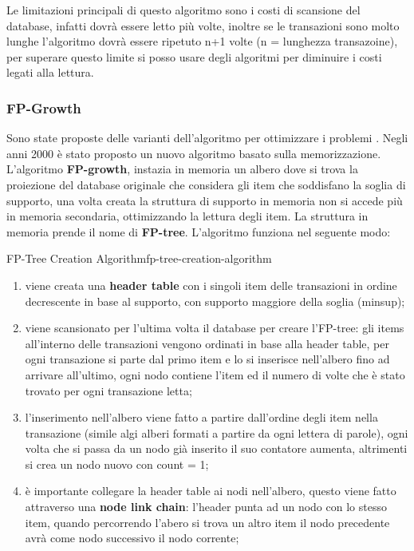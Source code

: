 \documentclass[12pt]{article}
\begin{document}
Le limitazioni principali di questo algoritmo sono i costi di scansione del database, infatti dovr\`a essere letto pi\`u volte, inoltre se le transazioni sono molto lunghe l'algoritmo dovr\`a essere ripetuto n+1 volte (n = lunghezza transazoine), per superare questo limite si posso usare degli algoritmi per diminuire i costi legati alla lettura.


\subsubsection{FP-Growth}
Sono state proposte delle varianti dell'algoritmo per ottimizzare i problemi . Negli anni 2000 \`e stato proposto un nuovo algoritmo basato sulla memorizzazione. L'algoritmo \textbf{FP-growth}, instazia in memoria un albero dove si trova la proiezione del database originale che considera gli item che soddisfano la soglia di supporto, una volta creata la struttura di supporto in memoria non si accede pi\`u in memoria secondaria, ottimizzando la lettura degli item. La struttura in memoria prende il nome di \textbf{FP-tree}. L'algoritmo funziona nel seguente modo:
\begin{definition}{FP-Tree Creation Algorithm}{fp-tree-creation-algorithm}
\begin{enumerate}
    \item viene creata una \textbf{header table} con i singoli item delle transazioni in ordine decrescente in base al supporto, con supporto maggiore della soglia (minsup);
    \item viene scansionato per l'ultima volta il database per creare l'FP-tree: gli items all'interno delle transazioni vengono ordinati in base alla header table, per ogni transazione si parte dal primo item e lo si inserisce nell'albero fino ad arrivare all'ultimo, ogni nodo contiene l'item ed il numero di volte che \`e stato trovato per ogni transazione letta;
    \item l'inserimento nell'albero viene fatto a partire dall'ordine degli item nella transazione (simile algi alberi formati a partire da ogni lettera di parole), ogni volta che si passa da un nodo gi\`a inserito il suo contatore aumenta, altrimenti si crea un nodo nuovo con count = 1;
    \item \`e importante collegare la header table ai nodi nell'albero, questo viene fatto attraverso una \textbf{node link chain}: l'header punta ad un nodo con lo stesso item, quando percorrendo l'abero si trova un altro item il nodo precedente avr\`a come nodo successivo il nodo corrente;
\end{enumerate}
\end{definition}
\end{document}
